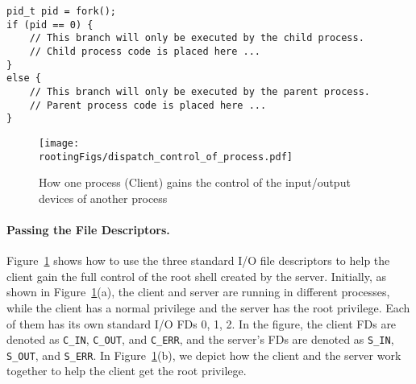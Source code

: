 \begin{lstlisting}[frame=single, caption={}, label=label]
pid_t pid = fork();
if (pid == 0) {
    // This branch will only be executed by the child process.
    // Child process code is placed here ...
}
else {
    // This branch will only be executed by the parent process.
    // Parent process code is placed here ...
}
\end{lstlisting}
 


\begin{figure}[htb]
  \begin{center}
    \texttt{[image: \\rootingFigs/dispatch\_control\_of\_process.pdf]}
  \end{center}
  \caption{How one process (Client) gains the control of the
       input/output devices of another process}
  \label{fig:rooting:dispatchingControl}
\end{figure}
 


\paragraph{Passing the File Descriptors.} 
Figure~\ref{fig:rooting:dispatchingControl} shows how to use the three standard I/O file
descriptors to help the client gain the full control of the root shell created by the server. 
Initially, as shown in Figure~\ref{fig:rooting:dispatchingControl}(a), 
the client and server are running in different processes,
while the client has a normal privilege and the server has the root
privilege. Each of them has its own standard I/O FDs 0, 1, 2. 
In the figure, the client FDs are denoted as 
\texttt{C\_IN}, \texttt{C\_OUT}, and \texttt{C\_ERR}, 
and the server’s FDs are denoted as \texttt{S\_IN}, \texttt{S\_OUT}, 
and \texttt{S\_ERR}. 
In Figure~\ref{fig:rooting:dispatchingControl}(b), we depict 
how the client and the server work together to help the client 
get the root privilege. 


